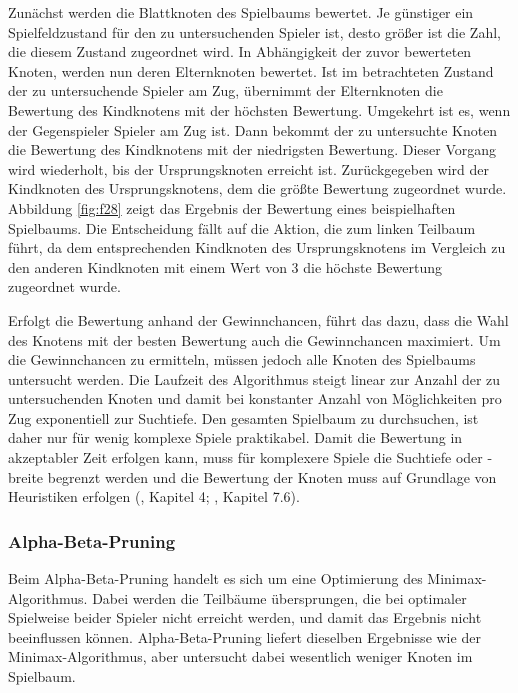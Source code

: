 Zunächst werden die Blattknoten des Spielbaums bewertet. Je günstiger ein Spielfeldzustand für den zu untersuchenden Spieler ist, desto größer ist die Zahl, die diesem Zustand zugeordnet wird. In Abhängigkeit der zuvor bewerteten Knoten, werden nun deren Elternknoten bewertet. Ist im betrachteten Zustand der zu untersuchende Spieler am Zug, übernimmt der Elternknoten die Bewertung des Kindknotens mit der höchsten Bewertung. Umgekehrt ist es, wenn der Gegenspieler Spieler am Zug ist. Dann bekommt der zu untersuchte Knoten die Bewertung des Kindknotens mit der niedrigsten Bewertung. Dieser Vorgang wird wiederholt, bis der Ursprungsknoten erreicht ist. Zurückgegeben wird der Kindknoten des Ursprungsknotens, dem die größte Bewertung zugeordnet wurde. Abbildung \ref{fig:f28} zeigt das Ergebnis der Bewertung eines beispielhaften Spielbaums. Die Entscheidung fällt auf die Aktion, die zum linken Teilbaum führt, da dem entsprechenden Kindknoten des Ursprungsknotens im Vergleich zu den anderen Kindknoten mit einem Wert von 3 die höchste Bewertung zugeordnet wurde.

Erfolgt die Bewertung anhand der Gewinnchancen, führt das dazu, dass die Wahl des Knotens mit der besten Bewertung auch die Gewinnchancen maximiert. Um die Gewinnchancen zu ermitteln, müssen jedoch alle Knoten des Spielbaums untersucht werden. Die Laufzeit des Algorithmus steigt linear zur Anzahl der zu untersuchenden Knoten und damit bei konstanter Anzahl von Möglichkeiten pro Zug exponentiell zur Suchtiefe. Den gesamten Spielbaum zu durchsuchen, ist daher nur für wenig komplexe Spiele praktikabel. Damit die Bewertung in akzeptabler Zeit erfolgen kann, muss für komplexere Spiele die Suchtiefe oder -breite begrenzt werden und die Bewertung der Knoten muss auf Grundlage von Heuristiken erfolgen (\cite{Ferguson.January2019}, Kapitel 4; \cite{Heineman.October2008}, Kapitel 7.6).

\subsubsection{Alpha-Beta-Pruning}

\label{alpha-beta-pruning}

Beim Alpha-Beta-Pruning handelt es sich um eine Optimierung des Minimax-Algorithmus. Dabei werden die Teilbäume übersprungen, die bei optimaler Spielweise beider Spieler nicht erreicht werden, und damit das Ergebnis nicht beeinflussen können. Alpha-Beta-Pruning liefert dieselben Ergebnisse wie der Minimax-Algorithmus, aber untersucht dabei wesentlich weniger Knoten im Spielbaum.

